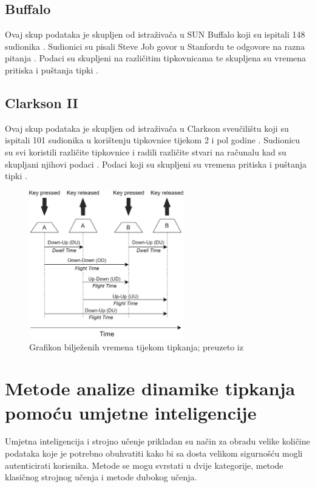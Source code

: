 \documentclass[]{foi}
\begin{document}
\section{Buffalo}
Ovaj skup podataka je skupljen od istraživača u SUN Buffalo koji su ispitali 148 sudionika \cite{Free-Text}. Sudionici su pisali Steve Job govor u Stanfordu te odgovore na razna pitanja \cite{Free-Text}. Podaci su skupljeni na različitim tipkovnicama te skupljena su vremena pritiska i puštanja tipki \cite{Free-Text}.

\section{Clarkson II}
Ovaj skup podataka je skupljen od istraživača u Clarkson sveučilištu koji su ispitali 101 sudionika u korištenju tipkovnice tijekom 2 i pol godine \cite{Free-Text}. Sudionicu su svi koristili različite tipkovnice i radili različite stvari na računalu kad su skupljani njihovi podaci \cite{Free-Text}. Podaci koji su skupljeni su vremena pritiska i puštanja tipki \cite{Free-Text}.


\begin{figure}[!h]
    \centering
    \includegraphics[width=0.6\textwidth]{slike/tipkanje-graf.jpg}
    \caption{Grafikon bilježenih vremena tijekom tipkanja; preuzeto iz \cite{Dias2023}}
    \label{fig:graf-vremena-tipkanja}
\end{figure}



\chapter{Metode analize dinamike tipkanja pomoću umjetne inteligencije}
Umjetna inteligencija i strojno učenje prikladan su način za obradu velike količine podataka koje je potrebno obuhvatiti kako bi sa dosta velikom sigurnošću mogli autenticirati korisnika. Metode se mogu svrstati u dvije kategorije, metode klasičnog strojnog učenja i metode dubokog učenja.
\end{document}
